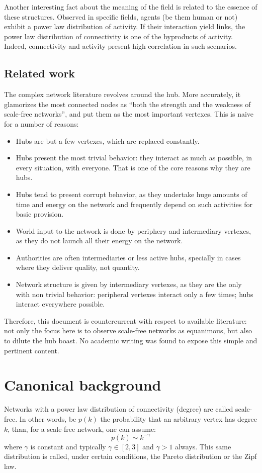 \documentclass[a4paper, 11pt]{article} %
\begin{document}
Another interesting fact about the meaning of the field is related to the essence of these structures. Observed in specific fields, agents (be them human or not) exhibit a power law distribution of activity. If their interaction yield links, the power law distribution of connectivity is one of the byproducts of activity. Indeed, connectivity and activity present high correlation in such scenarios.

\subsection{Related work}\label{sec:rel}
The complex network literature revolves around the hub. 
More accurately, it glamorizes the most connected nodes as ``both the strength and the weakness of scale-free networks'', and put them as the most important vertexes. This is naive for a number of reasons:
\begin{itemize}
    \item Hubs are but a few vertexes, which are replaced constantly.
    \item Hubs present the most trivial behavior: they interact as much as possible, in every situation, with everyone. That is one of the core reasons why they are hubs.
    \item Hubs tend to present corrupt behavior, as they undertake huge amounts of time and energy on the network and frequently depend on such activities for basic provision.
    \item World input to the network is done by periphery and intermediary vertexes, as they do not launch all their energy on the network.
    \item Authorities are often intermediaries or less active hubs, specially in cases where they deliver quality, not quantity.
    \item Network structure is given by intermediary vertexes, as they are the only with non trivial behavior: peripheral vertexes interact only a few times; hubs interact everywhere possible.
\end{itemize}

Therefore, this document is countercurrent with respect to available literature: not only the focus here is to observe scale-free networks as equanimous, but also to dilute the hub boast. No academic writing was found to expose this simple and pertinent content.

\section{Canonical background}\label{sec:can}
Networks with a power law distribution of connectivity (degree) are called scale-free. In other words, be $p(k)$ the probability that an arbitrary vertex has degree $k$, than, for a scale-free network, one can assume:
\begin{equation}
p(k) \sim k^{-\gamma}
\end{equation}
\noindent where $\gamma$ is constant and typically $\gamma \in [2,3]$ and $\gamma > 1$ always. This same distribution is called, under certain conditions, the Pareto distribution or the Zipf law.
\end{document}

